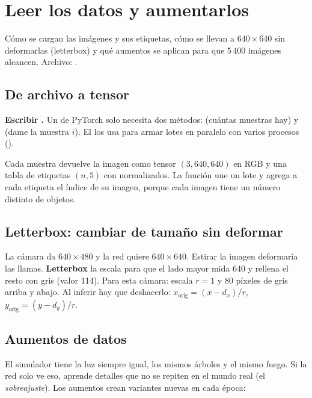 \chapter{Leer los datos y aumentarlos}
\label{cap:datos}

\begin{enpocas}
Cómo se cargan las imágenes y sus etiquetas, cómo se llevan a $640\times640$ sin
deformarlas (letterbox) y qué aumentos se aplican para que 5\,400 imágenes
alcancen. Archivo: .
\end{enpocas}

\section{De archivo a tensor}

 \textbf{Escribir .}
Un  de PyTorch solo necesita dos métodos:  (cuántas
muestras hay) y  (dame la muestra $i$). El
 los usa para armar lotes en paralelo con varios procesos
().

Cada muestra devuelve la imagen como tensor  $(3, 640, 640)$ en RGB y
una tabla de etiquetas $(n, 5)$ con  normalizados.
La función  une un lote y agrega a cada etiqueta el índice de su
imagen, porque cada imagen tiene un número distinto de objetos.

\section{Letterbox: cambiar de tamaño sin deformar}

La cámara da $640\times480$ y la red quiere $640\times640$. Estirar la imagen
deformaría las llamas. \textbf{Letterbox} la escala para que el lado mayor mida
640 y rellena el resto con gris (valor 114). Para esta cámara: escala $r = 1$ y
80 píxeles de gris arriba y abajo. Al inferir hay que deshacerlo:
$x_{\text{orig}} = (x - d_x)/r$, $y_{\text{orig}} = (y - d_y)/r$.

\section{Aumentos de datos}

El simulador tiene la luz siempre igual, los mismos árboles y el mismo fuego. Si
la red solo ve eso, aprende detalles que no se repiten en el mundo real (el
\emph{sobreajuste}). Los aumentos crean variantes nuevas en cada época:

